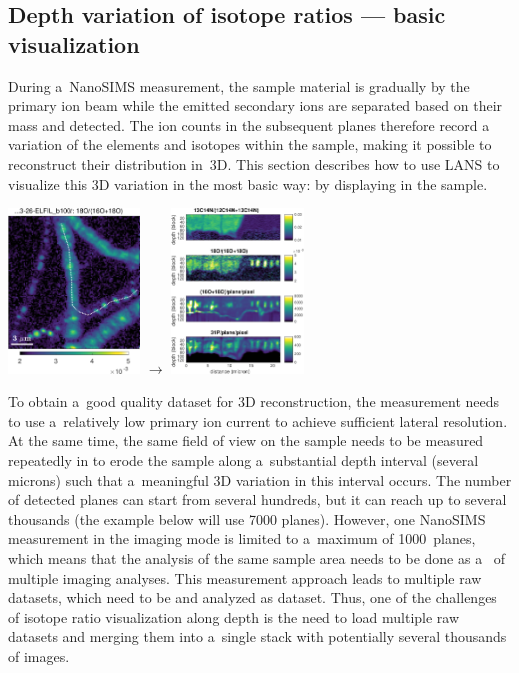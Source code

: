 \subsection{Depth variation of isotope ratios --- basic visualization}
\setcounter{step}{0}

\goldbox{}
\begin{minipage}[c]{0.5\textwidth}
During a~NanoSIMS measurement, the sample material is gradually  by the primary ion beam while the emitted secondary ions are sepa\-rated based on their mass and detected. The ion counts in the subsequent planes therefore record a~ variation of the elements and isotopes within the sample, making it possible to reconstruct their distribution in~3D. This section describes how to use LANS to visualize this 3D variation in the most basic way: by displaying  in the sample.
\end{minipage}\hfill
\begin{minipage}[c]{0.48\textwidth}
\includegraphics[width=3.5cm, valign=c]{figs3/18O-(16O+18O)-ilp.png}
$\rightarrow$
\includegraphics[width=3.5cm, valign=c]{figs3/18O-(16O+18O)-lpd.png}
\end{minipage}

\tcbe

To obtain a~good quality dataset for 3D reconstruction, the measurement needs to use a~relatively low primary ion current to achieve sufficient lateral resolution. At the same time, the same field of view on the sample needs to be measured repeatedly in  to erode the sample along a~substantial depth interval (several microns) such that a~meaningful 3D variation in this interval occurs. The number of detected planes can start from several hundreds, but it can reach up to several thousands (the example below will use 7000 planes). However, one NanoSIMS measurement in the imaging mode is limited to a~maximum of 1000~planes, which means that the analysis of the same sample area needs to be done as a~ of multiple imaging analyses. This measurement approach leads to multiple raw datasets, which need to be  and analyzed as  dataset. Thus, one of the challenges of isotope ratio visualization along depth is the need to load multiple raw datasets and merging them into a~single stack with potentially several thousands of images. 

